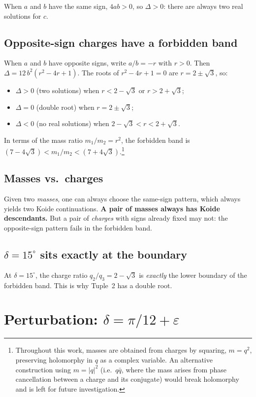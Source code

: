\documentclass[11pt]{article}
\begin{document}
When $a$ and $b$ have the same sign, $4ab > 0$,
so $\Delta > 0$: there are always two real solutions for $c$.

\subsection{Opposite-sign charges have a forbidden band}

When $a$ and $b$ have opposite signs, write $a/b = -r$ with $r>0$.
Then $\Delta = 12\,b^2(r^2 - 4r + 1)$.
The roots of $r^2 - 4r + 1 = 0$ are $r = 2 \pm \sqrt{3}$, so:
\begin{itemize}
  \item $\Delta > 0$ (two solutions) when
    $r < 2-\sqrt{3}$ or $r > 2+\sqrt{3}$;
  \item $\Delta = 0$ (double root) when $r = 2 \pm \sqrt{3}$;
  \item $\Delta < 0$ (no real solutions) when
    $2-\sqrt{3} < r < 2+\sqrt{3}$.
\end{itemize}
In terms of the mass ratio $m_1/m_2 = r^2$, the forbidden band is
$(7-4\sqrt3) < m_1/m_2 < (7+4\sqrt3)$.\footnote{Throughout
this work, masses are obtained from charges by squaring,
$m = q^2$, preserving holomorphy in $q$ as a complex variable.
An alternative construction using $m = |q|^2$ (i.e.\ $q\bar q$, where
the mass arises from phase cancellation between a charge and its conjugate)
would break holomorphy and is left for future investigation.}

\subsection{Masses vs.\ charges}

Given two \emph{masses}, one can always choose the same-sign
pattern, which always yields two Koide continuations.
\textbf{A pair of masses always has Koide descendants.}
But a pair of \emph{charges} with signs already fixed may not:
the opposite-sign pattern fails in the forbidden band.

\subsection{$\delta = 15^\circ$ sits exactly at the boundary}

At $\delta = 15^\circ$, the charge ratio $q_2/q_3 = 2 - \sqrt{3}$
is \emph{exactly} the lower boundary of the forbidden band.
This is why Tuple~2 has a double root.

\section{Perturbation: $\delta = \pi/12 + \varepsilon$}
\end{document}
